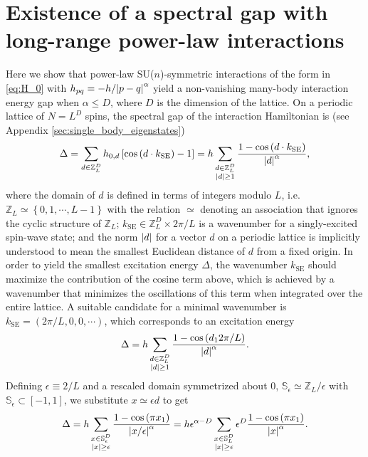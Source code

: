 \documentclass[nofootinbib,notitlepage,11pt]{revtex4-2}
\renewcommand{\t}{\text} %
\newcommand{\f}[2]{\dfrac{#1}{#2}} %
\newcommand{\p}[1]{\left(#1\right)} %
\renewcommand{\sp}[1]{\left[#1\right]} %
\renewcommand{\set}[1]{\left\{#1\right\}} %
\renewcommand{\c}{\cdot} %
\newcommand{\1}{\mathds{1}}
\renewcommand{\SS}{\mathbb{S}}
\newcommand{\ZZ}{\mathbb{Z}}
\begin{document}
\newpage
\appendix

\section{Existence of a spectral gap with long-range power-law
  interactions}
\label{sec:spectral_gap}

Here we show that power-law SU($n$)-symmetric interactions of the form
in \eqref{eq:H_0} with $h_{pq}=-h/\abs{p-q}^\alpha$ yield a
non-vanishing many-body interaction energy gap when $\alpha\le D$,
where $D$ is the dimension of the lattice.  On a periodic lattice of
$N=L^D$ spins, the spectral gap of the interaction Hamiltonian is (see
Appendix \ref{sec:single_body_eigenstates})
\begin{align}
  \Delta
  = \sum_{d\in\ZZ_L^D} h_{0,d} \sp{\cos\p{d \c k_{\t{SE}}}-1}
  = h \sum_{\substack{d\in\ZZ_L^D\\\abs{d}\ge1}}
  \f{1-\cos\p{d \c k_{\t{SE}}}}{\abs{d}^\alpha},
\end{align}
where the domain of $d$ is defined in terms of integers modulo $L$,
i.e.~$\ZZ_L\simeq\set{0,1,\cdots,L-1}$ with the relation $\simeq$
denoting an association that ignores the cyclic structure of $\ZZ_L$;
$k_{\t{SE}}\in\ZZ_L^D\times2\pi/L$ is a wavenumber for a
singly-excited spin-wave state; and the norm $\abs{d}$ for a vector
$d$ on a periodic lattice is implicitly understood to mean the
smallest Euclidean distance of $d$ from a fixed origin.  In order to
yield the smallest excitation energy $\Delta$, the wavenumber
$k_{\t{SE}}$ should maximize the contribution of the cosine term
above, which is achieved by a wavenumber that minimizes the
oscillations of this term when integrated over the entire lattice.  A
suitable candidate for a minimal wavenumber is
$k_{\t{SE}}=\p{2\pi/L,0,0,\cdots}$, which corresponds to an excitation
energy
\begin{align}
  \Delta = h \sum_{\substack{d\in\ZZ_L^D\\\abs{d}\ge1}}
  \f{1-\cos\p{d_12\pi/L}}{\abs{d}^\alpha}.
\end{align}
Defining $\epsilon\equiv2/L$ and a rescaled domain symmetrized about
$0$, $\SS_\epsilon\simeq\ZZ_L/\epsilon$ with
$\SS_\epsilon\subset\sp{-1,1}$, we substitute $x\simeq\epsilon d$ to
get
\begin{align}
  \Delta
  = h \sum_{\substack{x\in\SS_\epsilon^D\\\abs{x}\ge\epsilon}}
  \f{1-\cos\p{\pi x_1}}{\abs{x/\epsilon}^\alpha}
  = h \epsilon^{\alpha-D} \sum_{\substack{x\in\SS_L^D\\\abs{x}\ge\epsilon}}
  \epsilon^D \f{1-\cos\p{\pi x_1}}{\abs{x}^\alpha}.
\end{align}
\end{document}
